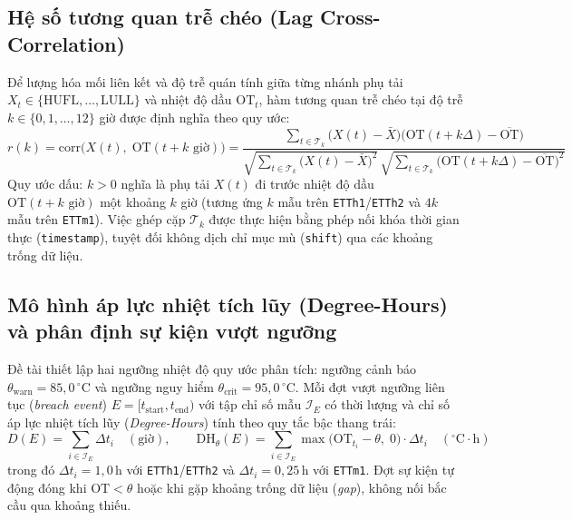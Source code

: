 \documentclass[12pt,a4paper,oneside]{report}
\newcommand{\code}[1]{\texttt{#1}}
\begin{document}
\subsection{Hệ số tương quan trễ chéo (Lag Cross-Correlation)}

Để lượng hóa mối liên kết và độ trễ quán tính giữa từng nhánh phụ tải $X_t \in \{\text{HUFL}, \dots, \text{LULL}\}$ và nhiệt độ dầu $\text{OT}_{t}$, hàm tương quan trễ chéo tại độ trễ $k \in \{0, 1, \dots, 12\}$ giờ được định nghĩa theo quy ước:
\begin{equation}
  r(k) = \mathrm{corr}\bigl(X(t),\; \text{OT}(t + k\text{ giờ})\bigr)
  = \frac{\sum_{t \in \mathcal{T}_k} \bigl(X(t) - \bar{X}\bigr)\bigl(\text{OT}(t + k\Delta) - \overline{\text{OT}}\bigr)}
         {\sqrt{\sum_{t \in \mathcal{T}_k}\bigl(X(t) - \bar{X}\bigr)^2}\,\sqrt{\sum_{t \in \mathcal{T}_k}\bigl(\text{OT}(t + k\Delta) - \overline{\text{OT}}\bigr)^2}}
\end{equation}
Quy ước dấu: $k > 0$ nghĩa là phụ tải $X(t)$ đi trước nhiệt độ dầu $\text{OT}(t+k\text{ giờ})$ một khoảng $k$ giờ (tương ứng $k$ mẫu trên \code{ETTh1}/\code{ETTh2} và $4k$ mẫu trên \code{ETTm1}). Việc ghép cặp $\mathcal{T}_k$ được thực hiện bằng phép nối khóa thời gian thực (\code{timestamp}), tuyệt đối không dịch chỉ mục mù (\code{shift}) qua các khoảng trống dữ liệu.

\subsection{Mô hình áp lực nhiệt tích lũy (Degree-Hours) và phân định sự kiện vượt ngưỡng}

Đề tài thiết lập hai ngưỡng nhiệt độ quy ước phân tích: ngưỡng cảnh báo $\theta_{\text{warn}} = 85{,}0\,^\circ\text{C}$ và ngưỡng nguy hiểm $\theta_{\text{crit}} = 95{,}0\,^\circ\text{C}$. Mỗi đợt vượt ngưỡng liên tục (\textit{breach event}) $E = [t_{\text{start}}, t_{\text{end}})$ với tập chỉ số mẫu $\mathcal{I}_E$ có thời lượng và chỉ số áp lực nhiệt tích lũy (\textit{Degree-Hours}) tính theo quy tắc bậc thang trái:
\begin{equation}
  D(E) = \sum_{i \in \mathcal{I}_E} \Delta t_i \quad (\text{giờ}), \qquad
  \text{DH}_{\theta}(E) = \sum_{i \in \mathcal{I}_E} \max\bigl(\text{OT}_{t_i} - \theta,\; 0\bigr) \cdot \Delta t_i \quad (^\circ\text{C}\cdot\text{h})
\end{equation}
trong đó $\Delta t_i = 1{,}0\,\text{h}$ với \code{ETTh1}/\code{ETTh2} và $\Delta t_i = 0{,}25\,\text{h}$ với \code{ETTm1}. Đợt sự kiện tự động đóng khi $\text{OT} < \theta$ hoặc khi gặp khoảng trống dữ liệu (\textit{gap}), không nối bắc cầu qua khoảng thiếu.
\end{document}
